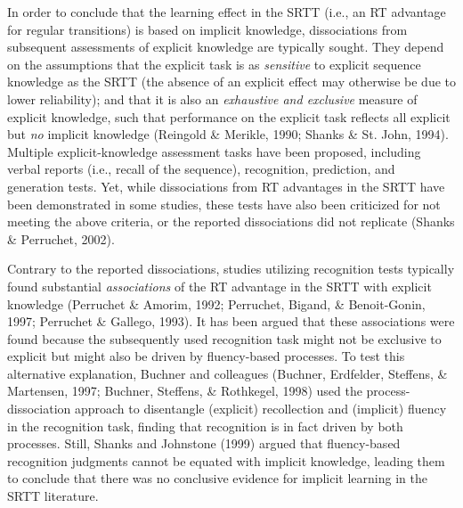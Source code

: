 \documentclass[english,,man]{apa6}
\begin{document}
In order to conclude that the learning effect in the SRTT (i.e., an RT advantage for regular transitions) is based on implicit knowledge, dissociations from subsequent assessments of explicit knowledge are typically sought.
They depend on the assumptions that the explicit task is as \emph{sensitive} to explicit sequence knowledge as the SRTT (the absence of an explicit effect may otherwise be due to lower reliability);
and that it is also an \emph{exhaustive and exclusive} measure of explicit knowledge, such that performance on the explicit task reflects all explicit but \emph{no} implicit knowledge (Reingold \& Merikle, 1990; Shanks \& St. John, 1994).
Multiple explicit-knowledge assessment tasks have been proposed, including verbal reports (i.e., recall of the sequence), recognition, prediction, and generation tests.
Yet, while dissociations from RT advantages in the SRTT have been demonstrated in some studies, these tests have also been criticized for not meeting the above criteria, or the reported dissociations did not replicate (Shanks \& Perruchet, 2002).

Contrary to the reported dissociations, studies utilizing recognition tests typically found substantial \emph{associations} of the RT advantage in the SRTT with explicit knowledge (Perruchet \& Amorim, 1992; Perruchet, Bigand, \& Benoit-Gonin, 1997; Perruchet \& Gallego, 1993).
It has been argued that these associations were found because the subsequently used recognition task might not be exclusive to explicit
but might also be driven by fluency-based processes.
To test this alternative explanation, Buchner and colleagues (Buchner, Erdfelder, Steffens, \& Martensen, 1997; Buchner, Steffens, \& Rothkegel, 1998) used the process-dissociation approach
to disentangle (explicit) recollection and (implicit) fluency in the recognition task, finding that recognition is in fact driven by both processes.
Still, Shanks and Johnstone (1999) argued that fluency-based recognition judgments cannot be equated with implicit knowledge,
leading them to conclude that there was no conclusive evidence for implicit learning in the SRTT literature.
\end{document}

